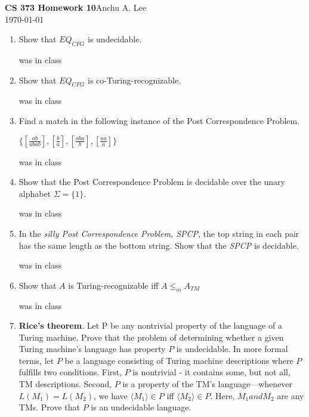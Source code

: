 \documentclass{article}
\begin{document}
    \noindent\textbf{CS 373 Homework 10}\hfill Anchu A. Lee\\
    \noindent\today\\
    \begin{enumerate}
        \item Show that $EQ_{CFG}$ is undecidable.\newline

        was in class
        \item Show that $EQ_{CFG}$ is co-Turing-recognizable.\newline

        was in class
        \item Find a match in the following instance of the Post
        Correspondence Problem.
        \begin{center}
            $\{[\frac{ab}{abab}], [\frac{b}{a}], [\frac{aba}{b}],
            [\frac{aa}{a}]\}$
        \end{center}
        was in class
        \item Show that the Post Correspondence Problem is decidable 
        over the unary alphabet $\Sigma = \{1\}$.\newline

        was in class
        \item  In the \textit{silly Post Correspondence Problem, SPCP}, 
        the top string in each pair has the same length as the bottom 
        string. Show that the \textit{SPCP} is decidable.\newline

        was in class
        \item Show that $A$ is Turing-recognizable iff $A\leq_{m} A_{TM}$\newline

        was in class
        \item \textbf{Rice’s theorem}. Let P be any nontrivial property of the language of a Turing
        machine. Prove that the problem of determining whether a given Turing machine’s
        language has property $P$ is undecidable.\newline
        In more formal terms, let $P$ be a language consisting of Turing machine descriptions 
        where $P$ fulfills two conditions. First, $P$ is nontrivial - it contains some, but
        not all, TM descriptions. Second, $P$ is a property of the TM’s language—whenever
        $L(M_1) = L(M_2)$, we have $\langle M_1 \rangle \in P $ iff $ \langle M_2 \rangle \in P$. 
        Here, $M_1 and M_2$ are any TMs. Prove that $P$ is an undecidable language.\newline


\end{enumerate}
\end{document}
